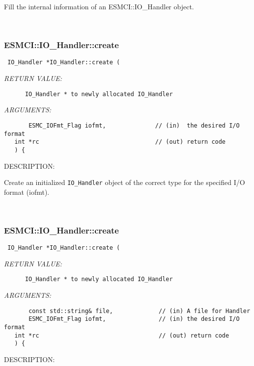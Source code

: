       Fill the internal information of an ESMCI::IO_Handler object.
   
 
\mbox{}\hrulefill\
 
\subsubsection [ESMCI::IO\_Handler::create] {ESMCI::IO\_Handler::create}


  
\begin{verbatim} IO_Handler *IO_Handler::create (\end{verbatim}{\em RETURN VALUE:}
\begin{verbatim}      IO_Handler * to newly allocated IO_Handler\end{verbatim}{\em ARGUMENTS:}
\begin{verbatim}       ESMC_IOFmt_Flag iofmt,              // (in)  the desired I/O format
   int *rc                                 // (out) return code
   ) {\end{verbatim}
{\sf DESCRIPTION:\\ }


      Create an initialized {\tt IO_Handler} object of the correct type for
      the specified I/O format (iofmt). 
 
\mbox{}\hrulefill\
 
\subsubsection [ESMCI::IO\_Handler::create] {ESMCI::IO\_Handler::create}


  
\begin{verbatim} IO_Handler *IO_Handler::create (\end{verbatim}{\em RETURN VALUE:}
\begin{verbatim}      IO_Handler * to newly allocated IO_Handler\end{verbatim}{\em ARGUMENTS:}
\begin{verbatim}       const std::string& file,             // (in) A file for Handler
       ESMC_IOFmt_Flag iofmt,               // (in) the desired I/O format
   int *rc                                  // (out) return code
   ) {\end{verbatim}
{\sf DESCRIPTION:\\ }


